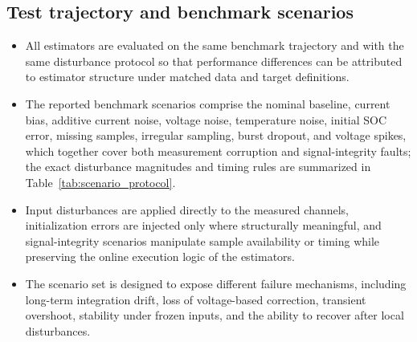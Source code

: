 \documentclass[review]{elsarticle}
\begin{document}
\subsection{Test trajectory and benchmark scenarios}
\begin{itemize}[leftmargin=*]
    \item All estimators are evaluated on the same benchmark trajectory and with the same disturbance protocol so that performance differences can be attributed to estimator structure under matched data and target definitions.
    \item The reported benchmark scenarios comprise the nominal baseline, current bias, additive current noise, voltage noise, temperature noise, initial SOC error, missing samples, irregular sampling, burst dropout, and voltage spikes, which together cover both measurement corruption and signal-integrity faults; the exact disturbance magnitudes and timing rules are summarized in Table~\ref{tab:scenario_protocol}.
    \item Input disturbances are applied directly to the measured channels, initialization errors are injected only where structurally meaningful, and signal-integrity scenarios manipulate sample availability or timing while preserving the online execution logic of the estimators.
    \item The scenario set is designed to expose different failure mechanisms, including long-term integration drift, loss of voltage-based correction, transient overshoot, stability under frozen inputs, and the ability to recover after local disturbances.
\end{itemize}
\end{document}
